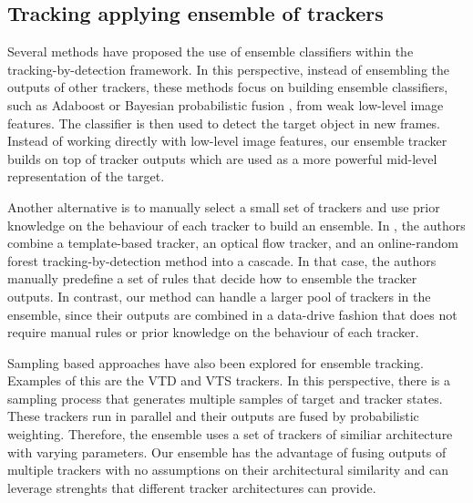 \subsection{Tracking applying ensemble of trackers}

Several methods have proposed the use of ensemble classifiers within
the tracking-by-detection framework.
In this perspective, instead of ensembling the outputs of other trackers,
these methods focus on building ensemble classifiers,
such as Adaboost \cite{Avidan2007} or Bayesian probabilistic fusion \cite{Bai2013},
from weak low-level image features.
The classifier is then used to detect the target object in
new frames. Instead of working directly with low-level image features,
our ensemble tracker builds on top of tracker outputs
which are used as a more powerful mid-level representation of the target.

Another alternative is to manually select a small set of trackers and use
prior knowledge on the behaviour of each tracker to build an ensemble.
In \cite{Santner2010a}, the authors combine a template-based tracker,
an optical flow tracker, and an online-random forest tracking-by-detection
method into a cascade.
In that case, the authors manually predefine a set of rules that decide
how to ensemble the tracker outputs. In contrast, our method can handle
a larger pool of trackers in the ensemble, since their outputs are combined
in a data-drive fashion that does not require manual rules or prior knowledge
on the behaviour of each tracker.


Sampling based approaches have also been explored for ensemble tracking.
Examples of this are the VTD \cite{Kwon2009} and
VTS \cite{Kwon2011a} trackers.
In this perspective, there is a sampling process that generates
multiple samples of target and tracker states. These trackers run in parallel
and their outputs are fused by probabilistic weighting. Therefore,
the ensemble uses a set of trackers of similiar architecture
with varying parameters. Our ensemble has the advantage of fusing outputs
of multiple trackers with no assumptions on their architectural similarity
and can leverage strenghts that different tracker architectures can provide.

